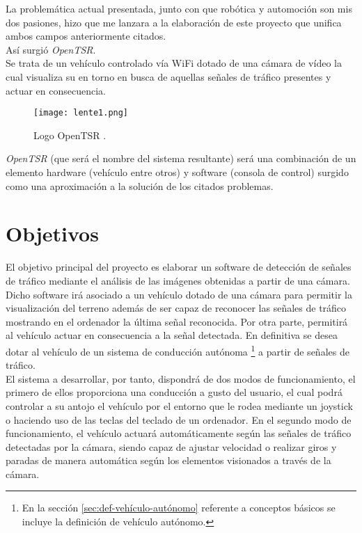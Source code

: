 La problemática actual presentada, junto con que robótica y automoción son mis dos pasiones, hizo que me lanzara a la elaboración de este proyecto que unifica ambos campos anteriormente citados.\\

Así surgió \emph{OpenTSR}.\\

Se trata de un vehículo controlado vía WiFi dotado de una cámara de vídeo la cual visualiza su en torno en busca de aquellas señales de tráfico presentes y actuar en consecuencia.\\

\begin{figure}[H]
  \begin{center}
    \texttt{[image: lente1.png]}
  \end{center}
  \label{fig:logo}
 \caption{Logo OpenTSR \protect\footnotemark.}
\end{figure}


\emph{OpenTSR} (que será el nombre del sistema resultante) será una combinación de un elemento hardware (vehículo entre otros) y software (consola de control) surgido como una aproximación a la solución de los citados problemas.\\

\section{Objetivos}
\label{sec:objetivos}

El objetivo principal del proyecto es elaborar un software de detección de señales de tráfico mediante el análisis de las imágenes obtenidas a partir de una cámara. Dicho software irá asociado a un vehículo dotado de una cámara para permitir la visualización del terreno además de ser capaz de reconocer las señales de tráfico mostrando en el ordenador la última señal reconocida. Por otra parte, permitirá al vehículo actuar en consecuencia a la señal detectada. En definitiva se desea dotar al vehículo de un sistema de conducción autónoma \footnote{En la sección \ref{sec:def-vehículo-autónomo} referente a conceptos básicos se incluye la definición de vehículo autónomo.} a partir de señales de tráfico.\\

El sistema a desarrollar, por tanto, dispondrá de dos modos de funcionamiento, el primero de ellos proporciona una conducción a gusto del usuario, el cual podrá controlar a su antojo el vehículo por el entorno que le rodea mediante un joystick o haciendo uso de las teclas del teclado de un ordenador. En el segundo modo de funcionamiento, el vehículo actuará automáticamente según las señales de tráfico detectadas por la cámara, siendo capaz de ajustar velocidad o realizar giros y paradas de manera automática según los elementos visionados a través de la cámara.\\

